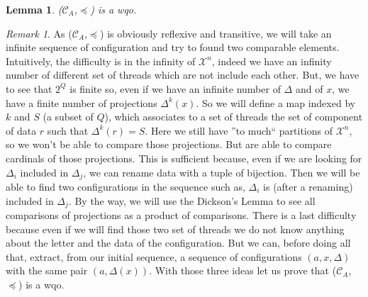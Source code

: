 \documentclass[a4paper,10pt]{report}
\newtheorem{lm}{Lemma}
\theoremstyle{remark}
\newtheorem{rk}{Remark}
\newcommand{\C}{\mathcal{C}_{A}}
\newcommand{\X}{\mathcal{X}^{n}}
\begin{document}
\begin{lm} \label{cd1}
  ($\C$,$\preceq$) is a wqo.
\end{lm}

\begin{rk}
  As ($\C$,$\preceq$) is obviously reflexive and transitive, we will take an infinite sequence of configuration and try to found two comparable elements.
  Intuitively, the difficulty is in the infinity of $\X$, indeed we have an infinity number of different set of threads which are not include each other.
  But, we have to see that $2^Q$ is finite so, even if we have an infinite number of $\Delta$ and of $x$, we have a finite number of projections $\Delta^k(x)$.
  So we will define a map indexed by $k$ and $S$ (a subset of $Q$), which associates to a set of threads the set of component of data $r$ such that $\Delta^k(r) = S$.
  Here we still have ''to much``  partitions of $\X$,  so we won't be able to compare those projections.
  But are able to compare cardinals of those projections.
  This is sufficient because, even if we are looking for $\Delta_i$ included in $\Delta_j$, we can rename data with a tuple of bijection.
  Then we will be able to find two configurations in the sequence such as, $\Delta_i$ is (after a renaming) included in $\Delta_j$.
  By the way, we will use the Dickson's Lemma to see all comparisons of projections as a product of comparisons.
  There is a last difficulty because even if we will find those two set of threads we do not know anything about the letter and the data of the configuration.
  But we can, before doing all that, extract, from our initial sequence, a sequence of configurations $(a,x,\Delta)$ with the same pair $(a,\Delta(x))$.
  With those three ideas let us prove that ($\C$,$\preceq$) is a wqo.
\end{rk}
\end{document}
